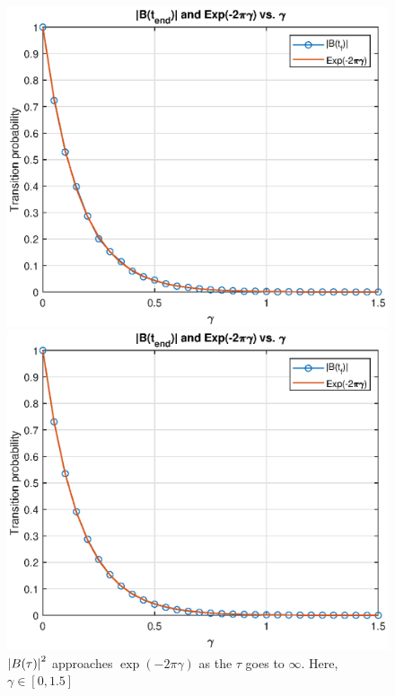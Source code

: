 \documentclass{book}
\theoremstyle{definition}
\begin{document}
\begin{figure}[!htb]
\begin{minipage}{0.49\textwidth}
		\includegraphics[width=\textwidth]{images/t200.eps}
		\caption{$\tau\in [-200,400]$}
		\includegraphics[width=\textwidth]{images/t400.eps}
		\caption{$\tau\in [-400,400]$}
	\end{minipage}
	\caption{$\abs{B(\tau)}^2$ approaches $\exp(-2\pi\gamma)$ as the $\tau$ goes to $\infty$. Here, $\gamma \in [0,1.5]$}
	\label{fig:tau_Infty}
\end{figure}
\end{document}
